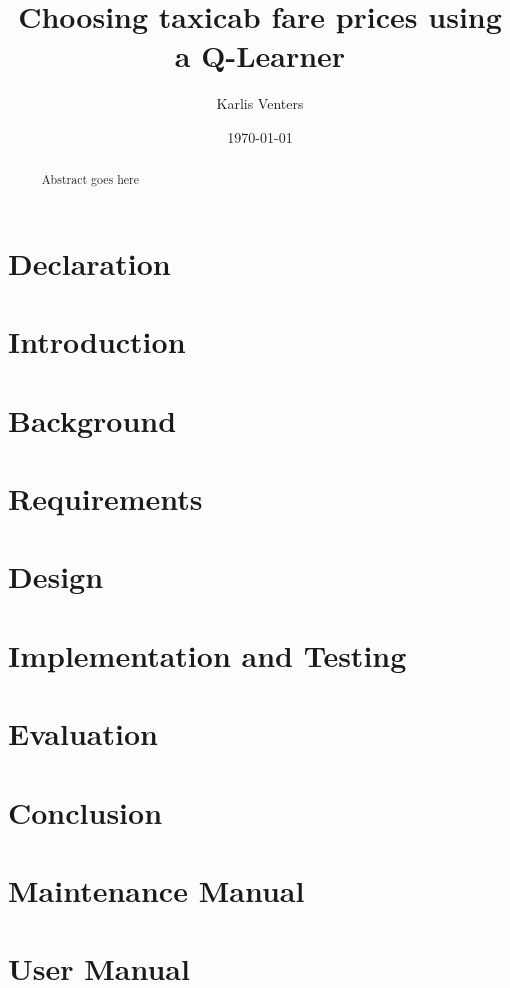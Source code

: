 \documentclass{csfourzero}
\title{Choosing taxicab fare prices using a Q-Learner}
\author{Karlis Venters}
\date{\today}
\begin{document}
\maketitle
% 

\begin{abstract}~
Abstract goes here
\end{abstract}

\newpage 
\section*{Declaration}


\newpage
\tableofcontents{}

\newpage
\listoffigures

\newpage
\section{Introduction}
\label{sec:intro}



\newpage
\section{Background}
\label{sec:literature}




\newpage
\section{Requirements}
\label{sec:requirements}


\newpage
\section{Design}
\label{sec:design}



\newpage
\section{Implementation and Testing}
\label{sec:implementation}



\newpage
\section{Evaluation}
\label{sec:evaluation}



\newpage
\section{Conclusion}
\label{sec:conclusion}


\newpage
\printbibliography

\newpage
\appendix
\section{Maintenance Manual}


\newpage
\section{User Manual}

\end{document}
